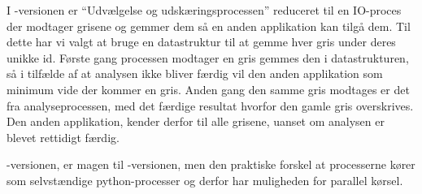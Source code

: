 I -versionen er ``Udvælgelse og udskæringsprocessen'' reduceret til en IO-proces der modtager grisene og gemmer dem så en anden applikation kan tilgå dem. Til dette har vi valgt at bruge en  datastruktur til at gemme  hver gris under deres unikke id. Første gang processen modtager en gris gemmes den i datastrukturen, så i tilfælde af at analysen ikke bliver færdig vil den anden applikation som minimum vide der kommer en gris. Anden gang den samme gris modtages er det fra analyseprocessen, med det færdige resultat hvorfor  den gamle gris overskrives. Den anden applikation, kender derfor til alle grisene, uanset om analysen er blevet rettidigt færdig.

-versionen, er magen til -versionen, men den praktiske forskel at processerne kører som selvstændige python-processer og derfor har muligheden for parallel kørsel. 


